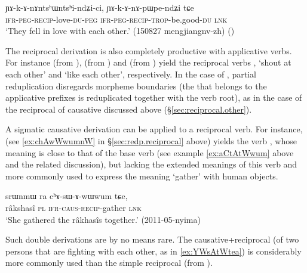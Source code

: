 \begin{exe}
\ex \label{ex:YAkAnApWpendZici}
\gll  ɲɤ-k-ɤ-nɤntsʰɯ\redp{}ntsʰi-ndʑi-ci, ɲɤ-k-ɤ-nɤ-pɯ\redp{}pe-ndʑi tɕe \\
\textsc{ifr}-\textsc{peg}-\textsc{recip}-love-\textsc{du}-\textsc{peg} \textsc{ifr}-\textsc{peg}-\textsc{recip}-\textsc{trop}-be.good-\textsc{du} \textsc{lnk}\\
\glt `They fell in love with each other.' (150827 mengjiangnv-zh) ()
\end{exe}

The reciprocal derivation is also completely productive with applicative verbs. For instance  (from ),  (from ) and  (from ) yield  the reciprocal verbs ,  `shout at each other'  and  `like each other', respectively. In the case of , partial reduplication disregards morpheme boundaries (the  that belongs to the applicative prefixes is reduplicated together with the verb root), as in the case of the reciprocal of causative  discussed above (§\ref{sec:reciprocal.other}).
 
A sigmatic causative derivation can be applied to a reciprocal verb. For instance,  (see \ref{ex:chAwWwumnW} in §\ref{sec:redp.reciprocal} above) yields the verb , whose meaning is close to that of the base verb  (see example \ref{ex:aCtAtWwum} above and the related discussion), but lacking the extended meanings of this verb and more commonly used to express the meaning `gather' with human objects.

\begin{exe}
\ex \label{ex:chAsAwWwum}
\gll  srɯnmɯ ra cʰɤ-sɯ-ɤ-wɯ\redp{}wum tɕe, \\
 râkshasî \textsc{pl} \textsc{ifr}-\textsc{caus}-\textsc{recip}-gather \textsc{lnk} \\
\glt `She gathered the râkhasîs together.' (2011-05-nyima)
\end{exe}

Such double derivations are by no means rare. The  causative+reciprocal  (of two persons that are fighting with each other, as in \ref{ex:YWsAtWtea}) is considerably more commonly used than the simple reciprocal  (from ). 


